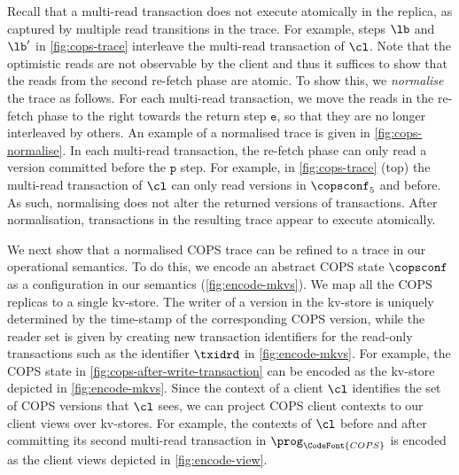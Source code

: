 

Recall that a multi-read transaction does not execute atomically in the replica,
as captured by multiple read transitions in the trace.
For example, steps \( \lb\) and \( \lb' \) in \cref{fig:cops-trace}
interleave the multi-read transaction of \( \cl \).
Note that the optimistic reads are not observable by the client and
thus it suffices to show that the reads from the second re-fetch phase are atomic.
To show this, we \emph{normalise} the trace as follows. 
For each multi-read transaction, 
we move the reads in the re-fetch phase to the right towards the return step \( \mathtt{e}\),
so that they are no longer interleaved by others.
An example of a normalised trace is given in \cref{fig:cops-normalise}.
In each multi-read transaction,
the re-fetch phase can only read a version committed before the \( \mathtt{p}\) step.
For example, in \cref{fig:cops-trace} (top)
the multi-read transaction of \( \cl \) can only read versions in \( \copsconf_5 \) and before.
As such, normalising does not alter the returned versions of transactions.
After normalisation, transactions in the resulting trace appear to execute atomically. 

We next show that a normalised COPS trace can be refined to a trace
in our operational semantics.
To do this, we encode an  abstract COPS state \(\copsconf \) as a configuration
in our  semantics (\cref{fig:encode-mkvs}). 
We map all the COPS replicas to a single kv-store.
The writer of a  version in the kv-store  is uniquely
determined by the time-stamp of the corresponding COPS version, 
while the  reader set 
is given by  creating new transaction identifiers for the
read-only transactions
such as the identifier \( \txidrd \) in \cref{fig:encode-mkvs}.
For example, the COPS state in \cref{fig:cops-after-write-transaction}
can be encoded as the kv-store depicted in \cref{fig:encode-mkvs}.
Since the context of a client $\cl$ identifies the set of COPS versions that $\cl$ sees, 
we can project COPS client contexts to our client views over kv-stores. 
For example, the contexts of \( \cl \) 
before and after committing its second multi-read transaction in \( \prog_{\CodeFont{COPS}} \) 
is encoded as the client views depicted in \cref{fig:encode-view}.

